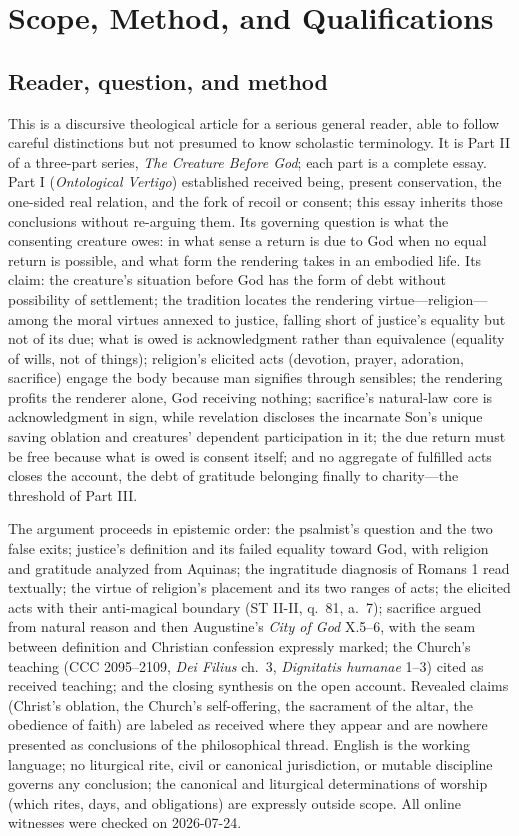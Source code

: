 \section{Scope, Method, and Qualifications}

\subsection{Reader, question, and method}

This is a discursive theological article for a serious general reader, able to follow careful distinctions but not presumed to know scholastic terminology. It is Part II of a three-part series, \emph{The Creature Before God}; each part is a complete essay. Part I (\emph{Ontological Vertigo}) established received being, present conservation, the one-sided real relation, and the fork of recoil or consent; this essay inherits those conclusions without re-arguing them. Its governing question is what the consenting creature owes: in what sense a return is due to God when no equal return is possible, and what form the rendering takes in an embodied life. Its claim: the creature's situation before God has the form of debt without possibility of settlement; the tradition locates the rendering virtue---religion---among the moral virtues annexed to justice, falling short of justice's equality but not of its due; what is owed is acknowledgment rather than equivalence (equality of wills, not of things); religion's elicited acts (devotion, prayer, adoration, sacrifice) engage the body because man signifies through sensibles; the rendering profits the renderer alone, God receiving nothing; sacrifice's natural-law core is acknowledgment in sign, while revelation discloses the incarnate Son's unique saving oblation and creatures' dependent participation in it; the due return must be free because what is owed is consent itself; and no aggregate of fulfilled acts closes the account, the debt of gratitude belonging finally to charity---the threshold of Part III.

The argument proceeds in epistemic order: the psalmist's question and the two false exits; justice's definition and its failed equality toward God, with religion and gratitude analyzed from Aquinas; the ingratitude diagnosis of Romans 1 read textually; the virtue of religion's placement and its two ranges of acts; the elicited acts with their anti-magical boundary (ST II-II, q.~81, a.~7); sacrifice argued from natural reason and then Augustine's \emph{City of God} X.5--6, with the seam between definition and Christian confession expressly marked; the Church's teaching (CCC 2095--2109, \emph{Dei Filius} ch.~3, \emph{Dignitatis humanae} 1--3) cited as received teaching; and the closing synthesis on the open account. Revealed claims (Christ's oblation, the Church's self-offering, the sacrament of the altar, the obedience of faith) are labeled as received where they appear and are nowhere presented as conclusions of the philosophical thread. English is the working language; no liturgical rite, civil or canonical jurisdiction, or mutable discipline governs any conclusion; the canonical and liturgical determinations of worship (which rites, days, and obligations) are expressly outside scope. All online witnesses were checked on 2026-07-24.

